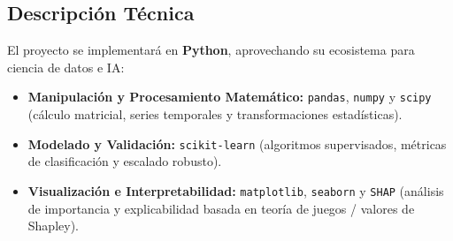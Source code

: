 \documentclass[10pt,letterpaper]{article}
\begin{document}
\subsection{Descripción Técnica}
El proyecto se implementará en \textbf{Python}, aprovechando su ecosistema para ciencia de datos e IA:
\begin{itemize}
    \item \textbf{Manipulación y Procesamiento Matemático:} \texttt{pandas}, \texttt{numpy} y \texttt{scipy} (cálculo matricial, series temporales y transformaciones estadísticas).
    \item \textbf{Modelado y Validación:} \texttt{scikit-learn} (algoritmos supervisados, métricas de clasificación y escalado robusto).
    \item \textbf{Visualización e Interpretabilidad:} \texttt{matplotlib}, \texttt{seaborn} y \texttt{SHAP} (análisis de importancia y explicabilidad basada en teoría de juegos / valores de Shapley).
\end{itemize}
\end{document}
